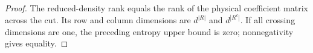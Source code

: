 \begin{proof}\leanok
    The reduced-density rank equals the rank of the physical
    coefficient matrix across the cut. Its row and column
    dimensions are $d^{|R|}$ and $d^{|R^c|}$. If all crossing
    dimensions are one, the preceding entropy upper bound is zero;
    nonnegativity gives equality.
\end{proof}
